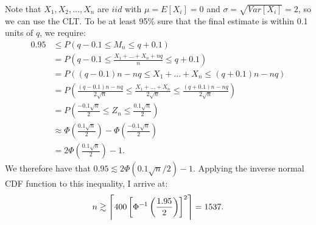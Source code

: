\begin{problem}{7} Note that $X_1, X_2, \ldots, X_n$ are $iid$ with $\mu = E[X_i] = 0$ and $\sigma = \sqrt{Var[X_i]} = 2$, so we can use the CLT.  To be at least 95\% sure that the final estimate is within 0.1 units of $q$, we require:
\begin{align*}
0.95 &\le P(q-0.1 \le M_n \le q+0.1) \\
& = P \left (q-0.1 \le \frac{X_1+\ldots+X_n +nq}{n} \le q+0.1 \right) \\
& = P \left ((q-0.1)n-nq \le X_1+\ldots+X_n \le (q+0.1)n-nq \right) \\
& = P \left (\frac{(q-0.1)n-nq}{2\sqrt{n}} \le \frac{X_1+\ldots+X_n}{2\sqrt{n}} \le \frac{(q+0.1)n-nq}{2\sqrt{n}} \right) \\
& = P \left (\frac{-0.1\sqrt{n}}{2} \le Z_n \le \frac{0.1\sqrt{n}}{2} \right) \\
& \approx \Phi \left( \frac{0.1\sqrt{n}}{2} \right)-\Phi \left( \frac{-0.1\sqrt{n}}{2} \right) \\
& = 2\Phi \left( \frac{0.1\sqrt{n}}{2} \right)-1.
\end{align*}
We therefore have that $0.95 \lesssim 2 \Phi(0.1\sqrt{n}/2)-1$.  Applying the inverse normal CDF function to this inequality, I arrive at:
\begin{equation}
n \gtrsim \ceil*{400\left[ \Phi^{-1} \left ( \frac{1.95}{2} \right)\right]^2} = 1537.
\end{equation}
\end{problem}

